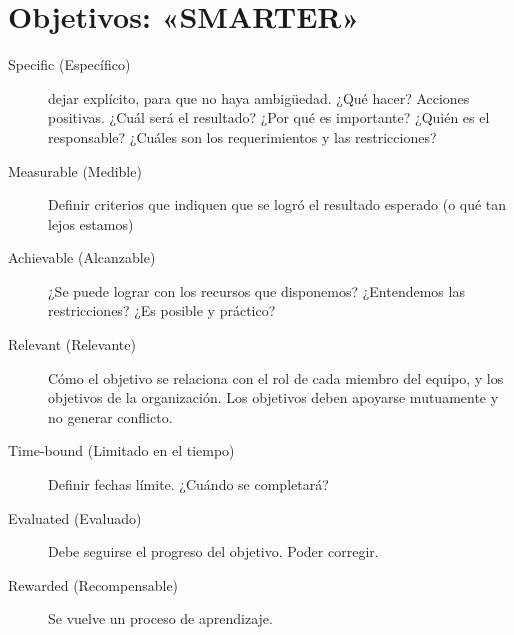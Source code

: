 \section*{Objetivos: «SMARTER»}
\begin{description}
	\item[Specific (Específico)] dejar explícito, para que no haya ambigüedad.
	¿Qué hacer? Acciones positivas.
	¿Cuál será el resultado?
	¿Por qué es importante?
	¿Quién es el responsable?
	¿Cuáles son los requerimientos y las restricciones?
	\item[Measurable (Medible)]
	Definir criterios que indiquen que se logró el resultado esperado (o qué tan lejos estamos)
\item[Achievable (Alcanzable)]
	¿Se puede lograr con los recursos que disponemos?
	¿Entendemos las restricciones?
	¿Es posible y práctico?
\item[Relevant (Relevante)]
	Cómo el objetivo se relaciona con el rol de cada miembro del equipo, y los objetivos de la organización.
	Los objetivos deben apoyarse mutuamente y no generar conflicto.
\item[Time-bound (Limitado en el tiempo)]
	Definir fechas límite.
	¿Cuándo se completará?
\item[Evaluated (Evaluado)]
	Debe seguirse el progreso del objetivo.
	Poder corregir.
\item[Rewarded (Recompensable)]
	Se vuelve un proceso de aprendizaje.
\end{description}
